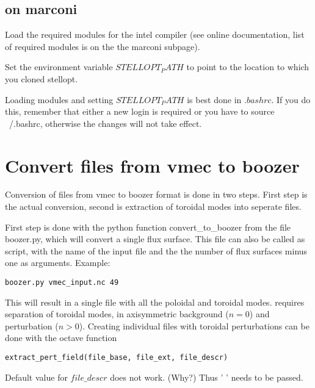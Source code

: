 \documentclass{article}
\begin{document}
\subsection{on marconi}
Load the required modules for the intel compiler (see online
documentation, list of required modules is on the the marconi subpage).

Set the environment variable $STELLOPT_PATH$ to point to the location to
which you cloned stellopt.

Loading modules and setting $STELLOPT_PATH$ is best done in $.bashrc$.
If you do this, remember that either a new login is required or you have
to source ~/.bashrc, otherwise the changes will not take effect.


\section{Convert files from vmec to boozer}
Conversion of files from vmec to boozer format is done in two steps.
First step is the actual conversion, second is extraction of toroidal
modes into seperate files.

First step is done with the python function convert_to_boozer
from the file boozer.py, which will convert a single flux surface.
This file can also be called as script, with the name of the input file
and the the number of flux surfaces minus one as arguments. Example:
\begin{verbatim}
boozer.py vmec_input.nc 49
\end{verbatim}
This will result in a single file with all the poloidal and toroidal
modes. \neotwo requires separation of toroidal modes, in axisymmetric
background ($n = 0$) and perturbation ($n > 0$).
Creating individual files  with toroidal perturbations can be done with
the octave function
\begin{verbatim}
extract_pert_field(file_base, file_ext, file_descr)
\end{verbatim}

Default value for $file\_descr$ does not work. (Why?) Thus ' ' needs to
be passed.
\end{document}
